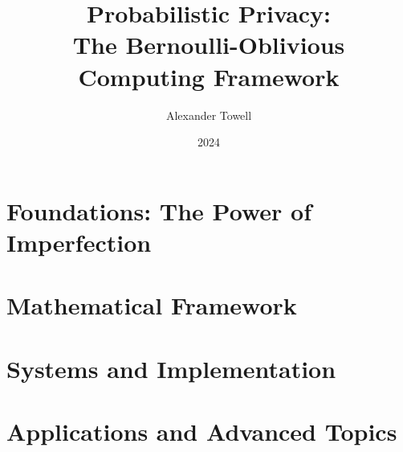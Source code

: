 \documentclass[11pt,oneside]{book}
\title{Probabilistic Privacy:\\The Bernoulli-Oblivious Computing Framework}
\author{Alexander Towell}
\date{2024}
\begin{document}
\frontmatter
\maketitle
\tableofcontents



\mainmatter

\part{Foundations: The Power of Imperfection}





\part{Mathematical Framework}





\part{Systems and Implementation}






\part{Applications and Advanced Topics}




\appendix




\backmatter
%
%
\end{document}
